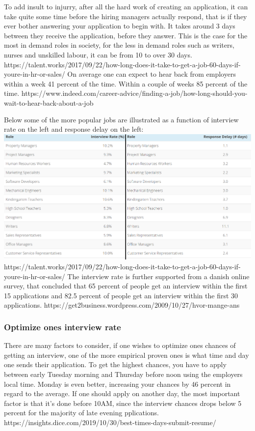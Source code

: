 To add insult to injurry, after all the hard work of creating an application, it can
take quite some time before the hiring managers actually respond, that is if they ever
bother answering your application to begin with.
It takes around 3 days between they receive the application, before they answer.
This is the case for the most in demand roles in society, for the less in demand roles
such as writers, nurses and unskilled labour, it can be from 10 to over 30 days.
https://talent.works/2017/09/22/how-long-does-it-take-to-get-a-job-60-days-if-youre-in-hr-or-sales/
On average one can expect to hear back from employers within a week 41 percent
of the time. Within a couple of weeks 85 percent of the time.
https://www.indeed.com/career-advice/finding-a-job/how-long-should-you-wait-to-hear-back-about-a-job

Below some of the more popular jobs are illustrated as a function of interview
rate on the left and response delay on the left:
\includegraphics{figures/interviewratexresponse delay.bmp}
https://talent.works/2017/09/22/how-long-does-it-take-to-get-a-job-60-days-if-youre-in-hr-or-sales/
The interview rate is further supported from a danish online survey, that concluded
that 65 percent of people get an interview within the first 15 applications and
 82.5 percent of people get an interview within the first 30 applications.
 https://get2business.wordpress.com/2009/10/27/hvor-mange-ans%

\subsubsection{Optimize ones interview rate}
There are many factors to consider, if one wishes to optimize ones
chances of getting an interview, one of the more empirical proven ones
is what time and day one sends their application.
To get the highest chances, you have to apply between early Tuesday morning
and Thursday before noon using the employers local time. Monday is even better,
increasing your chances by 46 percent in regard to the average.
If one should apply on another day, the most important factor is that
it's done before 10AM, since the interview chances drops below 5 percent for
the majority of late evening pplications.
https://insights.dice.com/2019/10/30/best-times-days-submit-resume/

